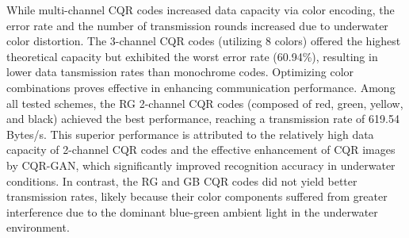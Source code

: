 \documentclass[preprint,12pt]{elsarticle}
\begin{document}

While multi-channel CQR codes increased data capacity via color encoding, the error rate and the number of transmission rounds increased due to underwater color distortion. The 3-channel CQR codes (utilizing 8 colors) offered the highest theoretical  capacity but exhibited the worst error rate (60.94\%), resulting in lower data tansmission rates than monochrome codes. 
Optimizing color combinations proves effective in enhancing communication performance. 
Among all tested schemes, the RG 2-channel CQR codes (composed of red, green, yellow, and black) achieved the best performance, reaching a transmission rate of 619.54 Bytes/s. This superior performance is attributed to the relatively high data capacity of 2-channel CQR codes and the effective enhancement of CQR images by CQR-GAN, which significantly improved recognition accuracy in underwater conditions.
In contrast, the RG and GB CQR codes did not yield better transmission rates, likely because their color components suffered from greater interference due to the dominant blue-green ambient light in the underwater environment.


\end{document}
